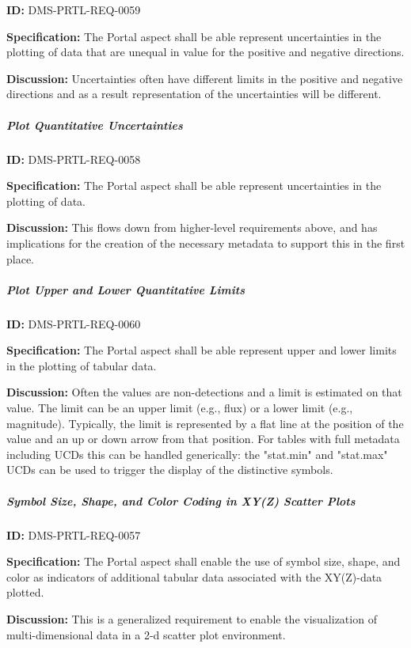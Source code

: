 \documentclass[SE,toc,lsstdraft]{lsstdoc}
\begin{document}
\label{DMS-PRTL-REQ-0059}
\textbf{ID:} DMS-PRTL-REQ-0059

\textbf{Specification:}
The Portal aspect shall be able represent uncertainties in the plotting of data that are unequal in value for the positive and negative directions.

\textbf{Discussion:}
Uncertainties often have different limits in the positive and negative directions and as a result representation of the uncertainties will be different.

\subparagraph{Plot Quantitative Uncertainties}\hfill  %

\label{DMS-PRTL-REQ-0058}
\textbf{ID:} DMS-PRTL-REQ-0058

\textbf{Specification:}
The Portal aspect shall be able represent uncertainties in the plotting of data.

\textbf{Discussion:}
This flows down from higher-level requirements above, and has implications for the creation of the necessary metadata to support this in the first place.

\subparagraph{Plot Upper and Lower Quantitative Limits}\hfill  %

\label{DMS-PRTL-REQ-0060}
\textbf{ID:} DMS-PRTL-REQ-0060

\textbf{Specification:}
The Portal aspect shall be able represent upper and lower limits in the plotting of tabular data.

\textbf{Discussion:}
Often the values are non-detections and a limit is estimated on that value.  The limit can be an upper limit (e.g., flux) or a lower limit (e.g., magnitude).  Typically, the limit is represented by a flat line at the position of the value and an up or down arrow from that position.
For tables with full metadata including UCDs this can be handled generically: the "stat.min" and "stat.max" UCDs can be used to trigger the display of the distinctive symbols.

\subparagraph{Symbol Size, Shape, and Color Coding in XY(Z) Scatter Plots}\hfill  %

\label{DMS-PRTL-REQ-0057}
\textbf{ID:} DMS-PRTL-REQ-0057

\textbf{Specification:}
The Portal aspect shall enable the use of symbol size, shape, and color as indicators of additional tabular data associated with the XY(Z)-data plotted.

\textbf{Discussion:}
This is a generalized requirement to enable the visualization of multi-dimensional data in a 2-d scatter plot environment.
\end{document}
